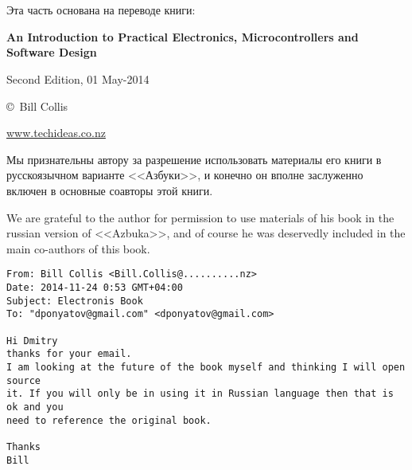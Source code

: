 \clearpage\section*{}

Эта часть основана на переводе книги:
\bigskip

\textbf{An Introduction to Practical Electronics, Microcontrollers and Software
Design}

Second Edition, 01 May-2014

\copyright\ Bill Collis

\url{www.techideas.co.nz}

\bigskip
Мы признательны автору за разрешение использовать материалы его книги в
русскоязычном варианте <<Азбуки>>, и конечно он вполне заслуженно включен в
основные соавторы этой книги.

\bigskip
We are grateful to the author for permission to use materials of his book in the
russian version of <<Azbuka>>, and of course he was deservedly included in the
main co-authors of this book.

\bigskip
\begin{verbatim}
From: Bill Collis <Bill.Collis@..........nz>
Date: 2014-11-24 0:53 GMT+04:00
Subject: Electronis Book
To: "dponyatov@gmail.com" <dponyatov@gmail.com>

Hi Dmitry
thanks for your email.
I am looking at the future of the book myself and thinking I will open source
it. If you will only be in using it in Russian language then that is ok and you
need to reference the original book.

Thanks
Bill
\end{verbatim}
